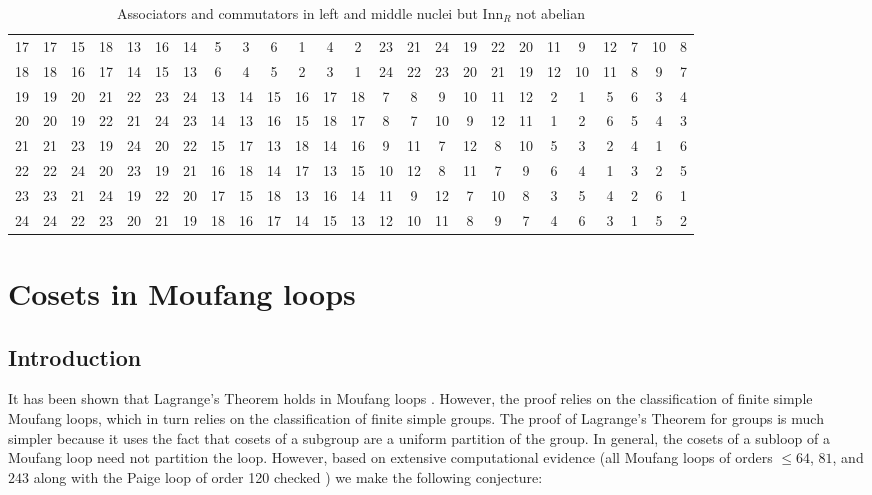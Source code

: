 \documentclass[12pt]{report}
\theoremstyle{definition}
\newcommand{\inn}{\text{Inn}}       %
\begin{document}
\begin{table}[H]
{\begin{tabular}{c | c c c c c c c c c c c c c c c c c c c c c c c c|}
     17& 17& 15& 18& 13& 16& 14&  5&  3&  6&  1&  4&  2& 23& 21& 24& 19& 22& 20& 11&  9& 12&  7& 10&  8 \\
     18& 18& 16& 17& 14& 15& 13&  6&  4&  5&  2&  3&  1& 24& 22& 23& 20& 21& 19& 12& 10& 11&  8&  9&  7 \\
     19& 19& 20& 21& 22& 23& 24& 13& 14& 15& 16& 17& 18&  7&  8&  9& 10& 11& 12&  2&  1&  5&  6&  3&  4 \\
     20& 20& 19& 22& 21& 24& 23& 14& 13& 16& 15& 18& 17&  8&  7& 10&  9& 12& 11&  1&  2&  6&  5&  4&  3 \\
     21& 21& 23& 19& 24& 20& 22& 15& 17& 13& 18& 14& 16&  9& 11&  7& 12&  8& 10&  5&  3&  2&  4&  1&  6 \\
     22& 22& 24& 20& 23& 19& 21& 16& 18& 14& 17& 13& 15& 10& 12&  8& 11&  7&  9&  6&  4&  1&  3&  2&  5 \\
     23& 23& 21& 24& 19& 22& 20& 17& 15& 18& 13& 16& 14& 11&  9& 12&  7& 10&  8&  3&  5&  4&  2&  6&  1 \\
     24& 24& 22& 23& 20& 21& 19& 18& 16& 17& 14& 15& 13& 12& 10& 11&  8&  9&  7&  4&  6&  3&  1&  5&  2 \\
     \hline
    \end{tabular}}
  \caption{Associators and commutators in left and middle nuclei but $\inn_R$ not abelian}
\end{table}


\chapter{Cosets in Moufang loops}

\section{Introduction}

It has been shown that Lagrange's Theorem holds in Moufang loops \cite{LG}. However, the proof
  relies on the classification of finite simple Moufang loops, which in turn relies on the
  classification of finite simple groups. The proof of Lagrange's Theorem for groups is much
  simpler because it uses the fact that cosets of a subgroup are a uniform partition of the group.
  In general, the cosets of a subloop of a Moufang loop need not partition the loop. However, based
  on extensive computational evidence (all Moufang loops of orders $\leq 64$, $81$, and $243$ along
  with the Paige loop of order 120 checked \cite{LOOPS}) we make the following conjecture:
\end{document}
